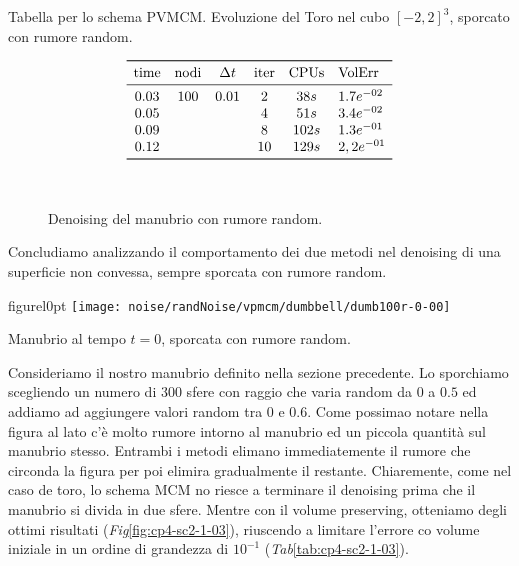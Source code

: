 \begin{table}[htb!]
\caption{Tabella per lo schema PVMCM. Evoluzione del Toro nel cubo
  $[-2,2]^3$, sporcato con rumore random.}
\label{tab:cp4-sc2-1-02}
\[
\begin{array}{*{5}{c}l}
    \toprule
    \text{time} &\text{nodi} &\Delta t &\text{iter} &\text{CPUs}&\text{VolErr} \\
    \midrule
     0.03       & 100        & 0.01    & 2          & 38s      &1.7e^{-02}\\
     0.05       &            &         & 4          & 51s      &3.4e^{-02}\\ 
     0.09       &            &         & 8          & 102s     &1.3e^{-01}\\ 
     0.12       &            &         & 10         & 129s     &2,2e^{-01}\\
     \bottomrule
\end{array}
\]
\end{table}

\begin{figure}[htb!]
  \centering
  \quad
  \\
  \quad
  \quad
  \caption{Denoising del manubrio con rumore random.}
  \label{fig:cp4-sc2-1-02}
\end{figure}
\newpage

Concludiamo analizzando il comportamento dei due metodi nel denoising
di una superficie non convessa, sempre sporcata con rumore random.

\begin{wrapfloat}{figure}{l}{0pt}
\texttt{[image: noise/randNoise/vpmcm/dumbbell/dumb100r-0-00]}
\caption{Manubrio al tempo $t=0$, sporcata con rumore random.}
\end{wrapfloat}

Consideriamo il nostro manubrio definito nella sezione
precedente. Lo sporchiamo scegliendo un numero di $300$ sfere con
raggio che varia random  da $0$ a $0.5$ ed addiamo ad aggiungere
 valori random tra $0$ e $0.6$. Come possimao notare nella figura al
 lato c'è molto rumore intorno al manubrio ed un piccola quantità sul
 manubrio stesso. Entrambi i metodi elimano immediatemente il rumore
 che circonda la figura per poi elimira gradualmente il
 restante. Chiaremente, come nel caso de toro, lo schema MCM no
 riesce a terminare il denoising prima che il manubrio si divida in
 due sfere. Mentre con il volume preserving, otteniamo degli ottimi
 risultati (\emph{Fig}\ref{fig:cp4-sc2-1-03}), riuscendo a limitare
 l'errore co volume  iniziale in un ordine di grandezza di $10^{-1}$
 (\emph{Tab}\ref{tab:cp4-sc2-1-03}). 

